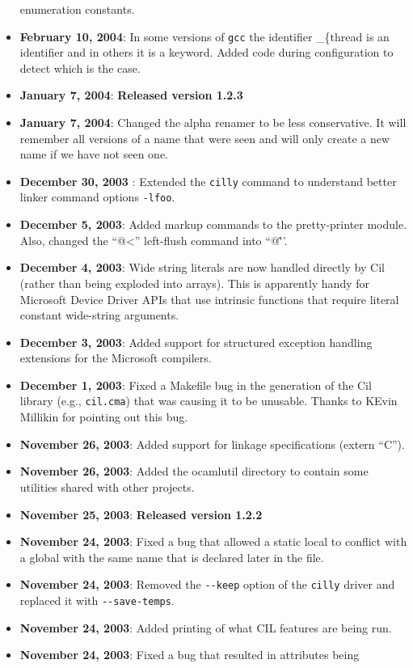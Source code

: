 \documentclass{article}
\def\t#1{{\tt #1}}
\begin{document}
\begin{itemize}
  enumeration constants.
\item {\bf February 10, 2004}: In some versions of \t{gcc} the identifier
  {\_\{thread} is an identifier and in others it is a keyword. Added code
  during configuration to detect which is the case. 
\item {\bf January 7, 2004}: {\bf Released version 1.2.3}
\item {\bf January 7, 2004}: Changed the alpha renamer to be less
conservative. It will remember all versions of a name that were seen and will
only create a new name if we have not seen one. 
\item {\bf December 30, 2003} : Extended the \t{cilly} command to understand
  better linker command options \t{-lfoo}. 
\item {\bf December 5, 2003}: Added markup commands to the pretty-printer
module. Also, changed the ``@<'' left-flush command into ``@\^''.
\item {\bf December 4, 2003}: Wide string literals are now handled
directly by Cil (rather than being exploded into arrays). This is
apparently handy for Microsoft Device Driver APIs that use intrinsic
functions that require literal constant wide-string arguments. 
\item {\bf December 3, 2003}: Added support for structured exception handling
  extensions for the Microsoft compilers.
\item {\bf December 1, 2003}: Fixed a Makefile bug in the generation of the 
Cil library (e.g., \t{cil.cma}) that was causing it to be unusable. Thanks
to KEvin Millikin for pointing out this bug. 
\item {\bf November 26, 2003}: Added support for linkage specifications
       (extern ``C''). 
\item {\bf November 26, 2003}: Added the ocamlutil directory to contain some
utilities shared with other projects. 
\item {\bf November 25, 2003}: {\bf Released version 1.2.2}
\item {\bf November 24, 2003}: Fixed a bug that allowed a static local to
  conflict with a global with the same name that is declared later in the
  file. 
\item {\bf November 24, 2003}: Removed the \t{-{}-keep} option of the \t{cilly}
  driver and replaced it with \t{-{}-save-temps}.
\item {\bf November 24, 2003}: Added printing of what CIL features are being
  run.
\item {\bf November 24, 2003}: Fixed a bug that resulted in attributes being

\end{itemize}
\end{document}

